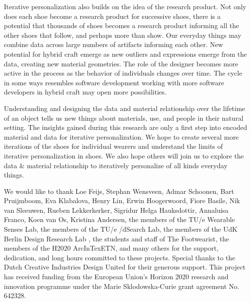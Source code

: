 Iterative personalization also builds on the idea of the research product\cite{Odom2016}. Not only does each shoe become a research product for successive shoes, there is a potential that thousands of shoes becomes a research product informing all the other shoes that follow, and perhaps more than show. Our everyday things may combine data across large numbers of artifacts informing each other. New potential for hybrid craft emerge as new outliers and expressions emerge from the data, creating new material geometries. The role of the designer becomes more active in the process as the behavior of individuals changes over time. The cycle in some ways resembles software development working with more software developers in hybrid craft may open more possibilities. 

Understanding and designing the data and material relationship over the lifetime of an object tells us new things about materials, use, and people in their natural setting. 
The insights gained during this research are only a first step into encoded material and data for iterative personalization. We hope to create several more iterations of the shoes for individual wearers and understand the limits of iterative personalization in shoes. We also hope others will join us to explore the data \& material relationship to iteratively personalize of all kinds everyday things.  

\begin{acks}
We would like to thank Loe Feijs, Stephan Wensveen, Admar Schoonen, Bart Pruijmboom, Eva Klabalova, Henry Lin, Erwin Hoogerwoord, Fiore Basile, Nik van Sleeuwen, Rueben Lekkerkerker, Sigridur Helga Hauksdottir, Annaluisa Franco, Koen van Os, Kristina Andersen, the members of the TU/e Wearable Senses Lab, the members of the TU/e /dSearch Lab, the members of the UdK Berlin Design Research Lab , the students and staff of The Footwearist, the members of the H2020 ArcInTexETN, and many others for the support, dedication, and long hours committed to these projects. Special thanks to the Dutch Creative Industries Design United for their generous support. This project has received funding from the European Union's Horizon 2020 research and innovation programme under the Marie Sklodowska-Curie grant agreement No. 642328.
\end{acks}
